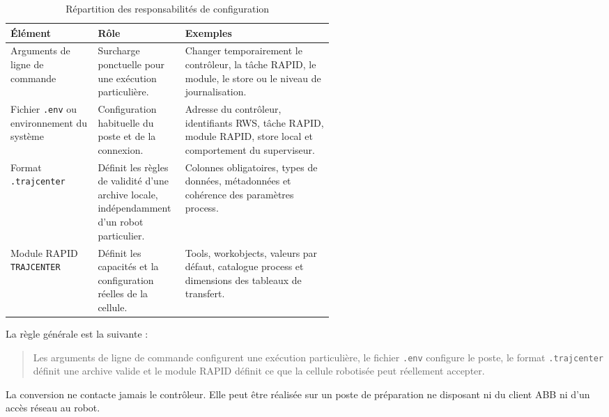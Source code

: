 \documentclass{rapportENSAM}
\begin{document}
\begin{table}[ht]
    \centering
    \small
    \begin{tabularx}{\linewidth}{
        |p{0.27\linewidth}
        |p{0.27\linewidth}
        |X|
    }
        \hline
        \textbf{Élément} &
        \textbf{Rôle} &
        \textbf{Exemples} \\
        \hline

        Arguments de ligne de commande &
        Surcharge ponctuelle pour une exécution particulière. &
        Changer temporairement le contrôleur, la tâche RAPID, le module, le
        store ou le niveau de journalisation. \\
        \hline

        Fichier \texttt{.env} ou environnement du système &
        Configuration habituelle du poste et de la connexion. &
        Adresse du contrôleur, identifiants RWS, tâche RAPID, module RAPID,
        store local et comportement du superviseur. \\
        \hline

        Format \texttt{.trajcenter} &
        Définit les règles de validité d'une archive locale, indépendamment
        d'un robot particulier. &
        Colonnes obligatoires, types de données, métadonnées et cohérence des
        paramètres process. \\
        \hline

        Module RAPID \texttt{TRAJCENTER} &
        Définit les capacités et la configuration réelles de la cellule. &
        Tools, workobjects, valeurs par défaut, catalogue process et dimensions
        des tableaux de transfert. \\
        \hline
    \end{tabularx}
    \caption{Répartition des responsabilités de configuration}
    \label{tab:pc-configuration-responsibilities}
\end{table}

La règle générale est la suivante :

\begin{quote}
Les arguments de ligne de commande configurent une exécution particulière,
le fichier \texttt{.env} configure le poste, le format
\texttt{.trajcenter} définit une archive valide et le module RAPID définit ce
que la cellule robotisée peut réellement accepter.
\end{quote}

La conversion ne contacte jamais le contrôleur. Elle peut être réalisée sur
un poste de préparation ne disposant ni du client ABB ni d'un accès réseau au
robot.
\end{document}

